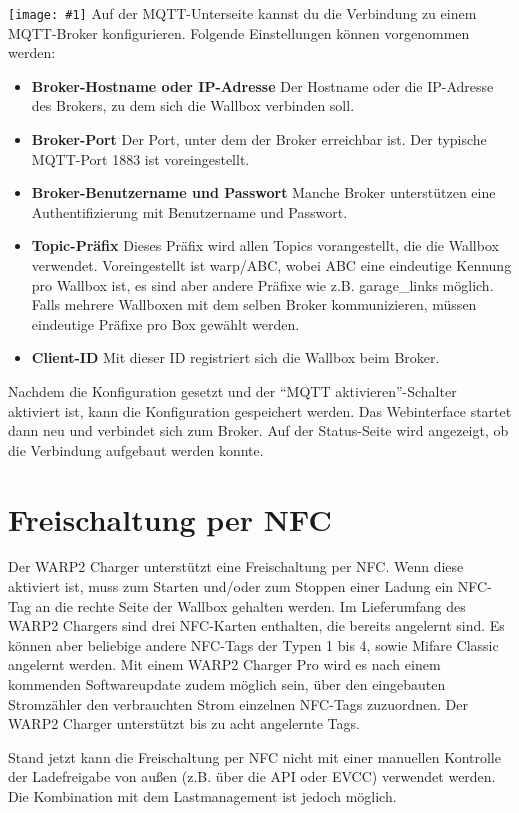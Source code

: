 \documentclass[a4paper,10pt]{article}
\newcommand{\hint}[1]{\begin{tcolorbox}[colback=boxgray,colframe=black,coltext=
white,title=Hinweis]#1\end{tcolorbox}}
\newcommand{\gfx}[1]{\texttt{[image: \#1]}}
\begin{document}
\begin{multicols*}{2}
	\gfx{./img_warp2/resized/web_mqtt}
	Auf der MQTT-Unterseite kannst du die Verbindung zu einem MQTT-Broker konfigurieren. Folgende Einstellungen können vorgenommen werden:
	\begin{itemize}
		\item \textbf{Broker-Hostname oder IP-Adresse} Der Hostname oder die IP-Adresse des Brokers, zu dem sich die Wallbox verbinden soll.
		\item \textbf{Broker-Port} Der Port, unter dem der Broker erreichbar ist. Der typische MQTT-Port 1883 ist voreingestellt.
		\item \textbf{Broker-Benutzername und Passwort} Manche Broker unterstützen eine Authentifizierung mit Benutzername und Passwort.
		\item \textbf{Topic-Präfix} Dieses Präfix wird allen Topics vorangestellt, die die Wallbox verwendet.
		      Voreingestellt ist warp/ABC, wobei ABC eine eindeutige Kennung pro Wallbox ist,
		      es sind aber andere Präfixe wie z.B. garage\_links möglich.
		      Falls mehrere Wallboxen mit dem selben Broker kommunizieren,
		      müssen eindeutige Präfixe pro Box gewählt werden.
		\item \textbf{Client-ID} Mit dieser ID registriert sich die Wallbox beim Broker.
	\end{itemize} 
	Nachdem die Konfiguration gesetzt und der \enquote{MQTT aktivieren}-Schalter aktiviert ist, kann die Konfiguration gespeichert werden.
	Das Webinterface startet dann neu und verbindet sich zum Broker.
	Auf der Status-Seite wird angezeigt, ob die Verbindung aufgebaut werden konnte.

	\section{Freischaltung per NFC}
	Der WARP2 Charger unterstützt eine Freischaltung per NFC. Wenn diese aktiviert ist,
	muss zum Starten und/oder zum Stoppen einer Ladung ein NFC-Tag an die rechte Seite
	der Wallbox gehalten werden. Im Lieferumfang des WARP2 Chargers sind drei NFC-Karten enthalten,
	die bereits angelernt sind. Es können aber beliebige andere NFC-Tags der Typen 1 bis 4,
	sowie Mifare Classic angelernt werden. Mit einem WARP2 Charger Pro wird es nach einem
	kommenden Softwareupdate zudem möglich sein, über den eingebauten Stromzähler
	den verbrauchten Strom einzelnen NFC-Tags zuzuordnen.
	Der WARP2 Charger unterstützt bis zu acht angelernte Tags.
	\hint{Stand jetzt kann die Freischaltung per NFC nicht mit einer manuellen Kontrolle der
	Ladefreigabe von außen (z.B. über die API oder EVCC) verwendet werden.
	Die Kombination mit dem Lastmanagement ist jedoch möglich.}


\end{multicols*}
\end{document}

